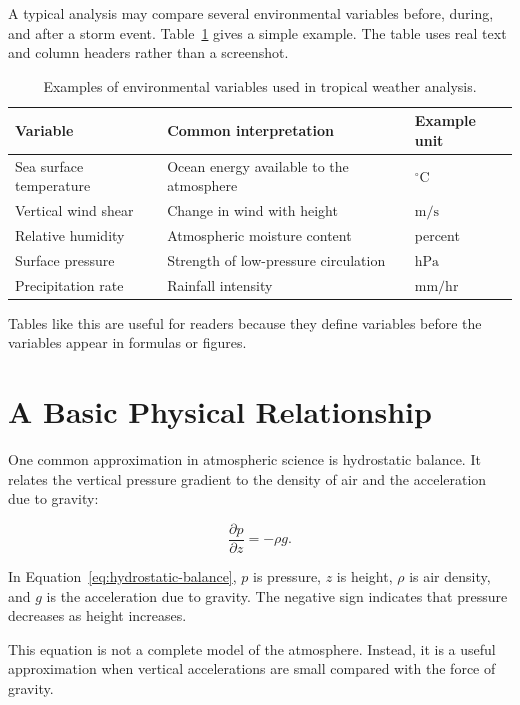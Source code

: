 A typical analysis may compare several environmental variables before, during, and after a storm event. Table~\ref{tab:meas-variables} gives a simple example. The table uses real text and column headers rather than a screenshot.

\begin{table}[htbp]
\caption{Examples of environmental variables used in tropical weather analysis.}
\label{tab:meas-variables}
\centering
\begin{tabular}{lll}
\toprule
Variable & Common interpretation & Example unit \\
\midrule
Sea surface temperature & Ocean energy available to the atmosphere & \(^{\circ}\mathrm{C}\) \\
Vertical wind shear & Change in wind with height & \(\mathrm{m/s}\) \\
Relative humidity & Atmospheric moisture content & percent \\
Surface pressure & Strength of low-pressure circulation & \(\mathrm{hPa}\) \\
Precipitation rate & Rainfall intensity & \(\mathrm{mm/hr}\) \\
\bottomrule
\end{tabular}
\end{table}

Tables like this are useful for readers because they define variables before the variables appear in formulas or figures.

\section{A Basic Physical Relationship}
\label{sec:meas-equation}

One common approximation in atmospheric science is hydrostatic balance. It relates the vertical pressure gradient to the density of air and the acceleration due to gravity:

\begin{equation}
\frac{\partial p}{\partial z} = -\rho g.
\label{eq:hydrostatic-balance}
\end{equation}

In Equation~\ref{eq:hydrostatic-balance}, \(p\) is pressure, \(z\) is height, \(\rho\) is air density, and \(g\) is the acceleration due to gravity. The negative sign indicates that pressure decreases as height increases.

This equation is not a complete model of the atmosphere. Instead, it is a useful approximation when vertical accelerations are small compared with the force of gravity.

